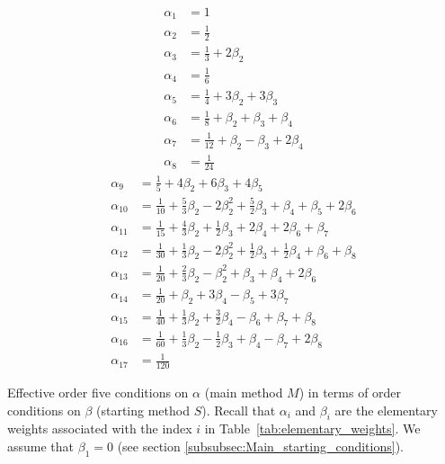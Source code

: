 \begin{table}
	\begin{multicols}{2}
		\begin{align*}
    		\alpha_1  &= 1 \\
     		\alpha_2  &= \tfrac{1}{2} \\
    		\alpha_3  &= \tfrac{1}{3} + 2\beta_2 \\
    		\alpha_4  &= \tfrac{1}{6} \\
    		\alpha_5  &= \tfrac{1}{4} + 3\beta_2 + 3\beta_3 \\
    		\alpha_6  &= \tfrac{1}{8} + \beta_2 + \beta_3 + \beta_4 \\
    		\alpha_7  &= \tfrac{1}{12} +\beta_2 - \beta_3 + 2\beta_4 \\
    		\alpha_8  &= \tfrac{1}{24}
    	\end{align*}
    	\vfill
    	\columnbreak
    	\begin{align*}
    		\alpha_9  &= \tfrac{1}{5} + 4\beta_2 + 6\beta_3 + 4\beta_5 \\
    		\alpha_{10} &= \tfrac{1}{10} + \tfrac{5}{3}\beta_2 - 2\beta_2^{2} + \tfrac{5}{2}\beta_3 + \beta_4 + \beta_5 + 2\beta_6 \\
    		\alpha_{11} &= \tfrac{1}{15} + \tfrac{4}{3}\beta_2 + \tfrac{1}{2}\beta_3 + 2\beta_4 + 2\beta_6 + \beta_7 \\
    		\alpha_{12} &= \tfrac{1}{30} + \tfrac{1}{3}\beta_2 - 2\beta_2^{2} + \tfrac{1}{2}\beta_3 + \tfrac{1}{2}\beta_4 + \beta_6 + \beta_8 \\
    		\alpha_{13} &= \tfrac{1}{20} + \tfrac{2}{3}\beta_2 - \beta_2^{2} + \beta_3 + \beta_4 + 2\beta_6 \\
    		\alpha_{14} &= \tfrac{1}{20} + \beta_2 + 3\beta_4 - \beta_5 + 3\beta_7 \\
    		\alpha_{15} &= \tfrac{1}{40} + \tfrac{1}{3}\beta_2 + \tfrac{3}{2}\beta_4 - \beta_6 + \beta_7 + \beta_8 \\
    		\alpha_{16} &= \tfrac{1}{60} + \tfrac{1}{3}\beta_2 - \tfrac{1}{2}\beta_3 + \beta_4 - \beta_7 + 2\beta_8 \\
    		\alpha_{17} &= \tfrac{1}{120}
    	\end{align*}%
    \end{multicols}
    \caption{Effective order five conditions on $\alpha$ (main method $M$) in terms of order 
    				conditions on $\beta$ (starting method $S$). Recall that $\alpha_i$ and $\beta_i$ 
    				are the elementary weights associated with the index $i$ in 
    				Table~\ref{tab:elementary_weights}.
    				We assume that $\beta_1=0$ (see section \ref{subsubsec:Main_starting_conditions}).}
    \label{tab:effective_OCs_on_alpha}
\end{table}

